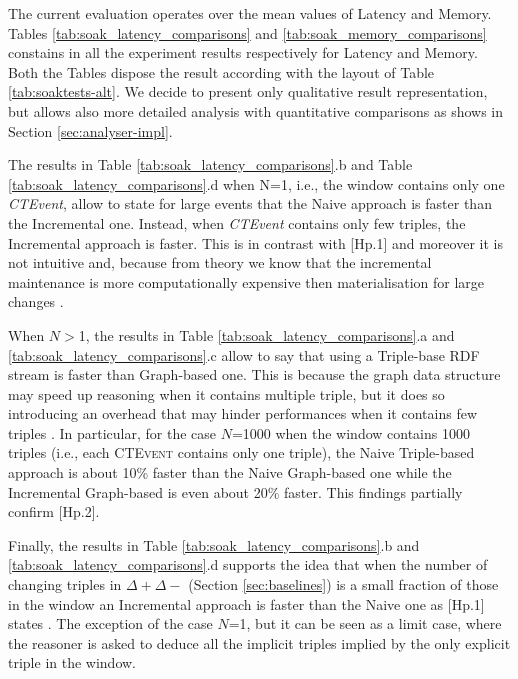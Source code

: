 The current evaluation operates over the mean values of Latency and Memory. Tables \ref{tab:soak_latency_comparisons} and \ref{tab:soak_memory_comparisons} constains in all the experiment results respectively for Latency and Memory.  Both the Tables dispose the result according with the layout of Table \ref{tab:soaktests-alt}. We decide to present only qualitative result representation, but \name allows also more detailed analysis with quantitative comparisons as shows in Section \ref{sec:analyser-impl}.

The results in Table \ref{tab:soak_latency_comparisons}.b and Table \ref{tab:soak_latency_comparisons}.d when N=1, i.e., the window contains only one \textit{CTEvent}, allow to state for large events that the Naive approach is faster than the Incremental one. Instead, when \textit{CTEvent} contains only few triples, the Incremental approach is faster. This is in contrast with [Hp.1] and moreover it is not intuitive and, because from theory we know that the incremental maintenance is more computationally expensive then materialisation for large changes \cite{DellAglio2014,DBLP:conf/cikm/RenP11,DBLP:conf/semweb/UrbaniMJHB13}. 

When $N>$1, the results in Table \ref{tab:soak_latency_comparisons}.a and \ref{tab:soak_latency_comparisons}.c allow to say that using a Triple-base RDF stream is faster than Graph-based one. This is because the graph data structure may speed up reasoning when it contains multiple triple, but it does so introducing an overhead that may hinder performances when it contains few triples \cite{DBLP:conf/semweb/BalduiniVDTPC13}. In particular, for the case $N$=1000 when the window contains 1000 triples (i.e., each \textsc{CTEvent} contains only one triple),  the Naive Triple-based approach is about 10\% faster  than the Naive Graph-based one while the Incremental Graph-based is even about 20\% faster. This findings partially confirm [Hp.2].

Finally, the results in Table \ref{tab:soak_latency_comparisons}.b and \ref{tab:soak_latency_comparisons}.d supports the idea that when the number of changing triples in $\Delta+ \Delta-$ (Section \ref{sec:baselines}) is a small fraction of those in the window an Incremental approach is faster than the Naive one as [Hp.1] states \cite{DellAglio2014,DBLP:conf/cikm/RenP11,DBLP:conf/semweb/UrbaniMJHB13}. The exception of the case $N$=1, but it can be seen as a limit case, where the reasoner is asked to deduce all the implicit triples implied by the only explicit triple in the window.  

